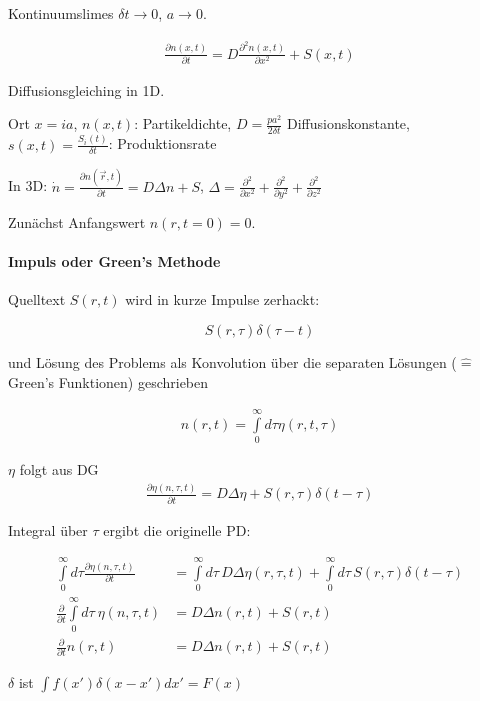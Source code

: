 \documentclass[a4paper,ngerman]{scrbook}
\begin{document}
Kontinuumslimes $\delta t \to 0$, $a \to 0$.

\begin{align*}
  \frac{\partial n(x,t)}{\partial t} = D\frac{\partial^2 n(x,t)}{\partial x^2} + S(x,t)
\end{align*}

Diffusionsgleiching in 1D.

Ort $x = ia$, $n(x,t)$: Partikeldichte, $D = \frac{pa^2}{2\delta t}$ Diffusionskonstante, $s(x,t) = \frac{S_i(t)}{\delta t}$: Produktionsrate

In 3D: $\dot{n} = \frac{\partial n(\vec{r},t)}{\partial t} = D\Delta n + S$, $\Delta = \frac{\partial^2}{\partial x^2} + \frac{\partial^2}{\partial y^2} + \frac{\partial^2}{\partial z^2}$

Zunächst Anfangswert $n(r, t=0)=0$.

\paragraph{Impuls oder Green's Methode}

Quelltext $S(r,t)$ wird in kurze Impulse zerhackt:

\[
  S(r,\tau) \delta(\tau -t)
\]

und Lösung des Problems als Konvolution über die separaten Lösungen ($\hat{=}$ Green's Funktionen) geschrieben

\begin{align*}
  n(r,t) = \int\limits_0^\infty d\tau \eta(r,t,\tau)
\end{align*}

$\eta$ folgt aus DG
\begin{align*}
  \frac{\partial \eta(n,\tau,t)}{\partial t} = D\Delta\eta + S(r,\tau)\delta(t-\tau)
\end{align*}

Integral über $\tau$ ergibt die originelle PD:

\begin{align*}
  \int\limits_0^\infty \! d\tau \frac{\partial \eta(n,\tau,t)}{\partial t} &= \int\limits_0^\infty\! d\tau\, D\Delta\eta(r,\tau,t) + \int\limits_0^\infty\! d\tau\, S(r,\tau)\delta(t-\tau)\\
\frac{\partial}{\partial t} \int\limits_0^\infty \! d\tau \ \eta(n,\tau,t) &= D\Delta n(r,t) + S(r,t)\\
\frac{\partial}{\partial t} n(r,t) &= D\Delta n(r,t) + S(r,t)
\end{align*}

$\delta$ ist $\int f(x') \delta(x-x')dx' = F(x)$
\end{document}
